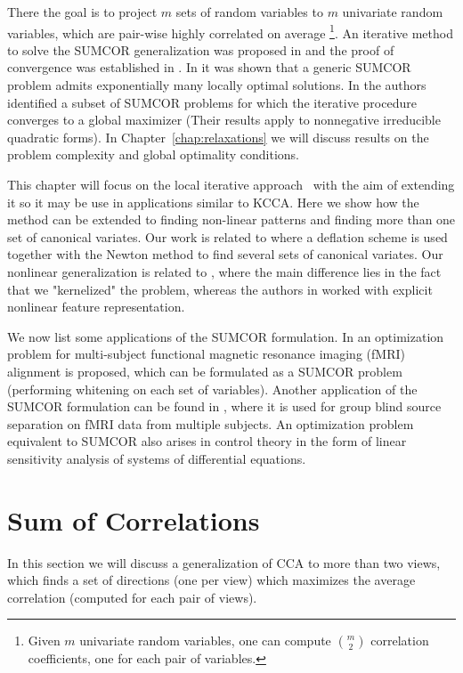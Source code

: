 There the goal is to project $m$ sets of random variables to $m$ univariate random variables, 
which are pair-wise highly correlated on average
\footnote{Given $m$ univariate random variables, one can compute $\binom{m}{2}$ correlation 
coefficients, one for each pair of variables.}. 
An iterative method to solve the SUMCOR generalization was proposed in \cite{Horst} 
and the proof of convergence was established in \cite{Chu}. In \cite{Chu} it was shown 
that a generic SUMCOR problem admits exponentially many locally optimal solutions. 
In \cite{GlobalMEP2} the authors identified a subset of SUMCOR problems for which the iterative 
procedure converges to a global maximizer (Their results apply to nonnegative irreducible quadratic forms).
In Chapter~\ref{chap:relaxations} we will discuss results on the problem complexity and global optimality
conditions.

This chapter will focus on the local iterative approach~\cite{Horst} with the aim of extending it
so it may be use in applications similar to KCCA.
Here we show how the method can be extended to finding non-linear patterns and finding more than one 
set of canonical variates. Our work is related to \cite{JointBSSAppl} where a deflation scheme 
is used together with the Newton method to find several sets of canonical variates. 
Our nonlinear generalization is related to \cite{nonlinJointBSS}, where the main difference 
lies in the fact that we "kernelized" the problem, whereas the authors in \cite{nonlinJointBSS} 
worked with explicit nonlinear feature representation.

We now list some applications of the SUMCOR formulation. In \cite{kernelHyperAppl} an optimization 
problem for multi-subject functional magnetic resonance imaging (fMRI) alignment is proposed, 
which can be formulated as a SUMCOR problem (performing whitening on each set of variables). 
Another application of the SUMCOR formulation can be found in \cite{JointBSSAppl}, 
where it is used for group blind source separation on fMRI data from multiple subjects. 
An optimization problem equivalent to SUMCOR also arises in control theory \cite{ControlApplication} 
in the form of linear sensitivity analysis of systems of differential equations.

\section{Sum of Correlations}\label{chap:extensions:sumcor}

In this section we will discuss a generalization of CCA to more than two views, 
which finds a set of directions (one per view) which maximizes the average correlation 
(computed for each pair of views).

